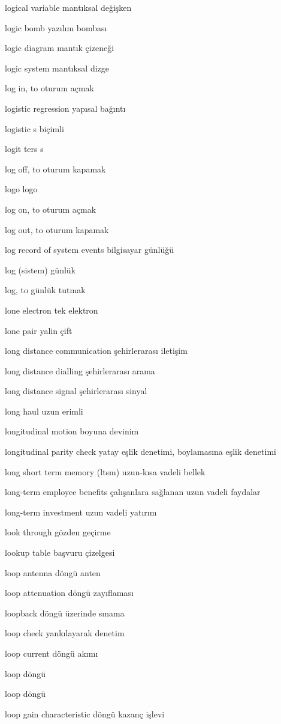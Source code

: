 \documentclass[12pt,fleqn]{article}\usepackage{../../common}
\begin{document}
logical variable mantıksal değişken

logic bomb yazılım bombası

logic diagram mantık çizeneği

logic system mantıksal dizge

log in, to oturum açmak

logistic regression yapısal bağıntı

logistic s biçimli

logit ters s

log off, to oturum kapamak

logo logo

log on, to oturum açmak

log out, to oturum kapamak

log record of system events bilgisayar günlüğü

log (sistem) günlük

log, to günlük tutmak

lone electron tek elektron

lone pair yalin çift

long distance communication şehirlerarası iletişim

long distance dialling şehirlerarası arama

long distance signal şehirlerarası sinyal

long haul uzun erimli

longitudinal motion boyuna devinim

longitudinal parity check yatay eşlik denetimi, boylamasına eşlik denetimi

long short term memory (ltsm) uzun-kısa vadeli bellek

long-term employee benefits çalışanlara sağlanan uzun vadeli faydalar

long-term investment uzun vadeli yatırım

look through gözden geçirme

lookup table başvuru çizelgesi

loop antenna döngü anten

loop attenuation döngü zayıflaması

loopback döngü üzerinde sınama

loop check yankılayarak denetim

loop current döngü akımı

loop döngü

loop döngü

loop gain characteristic döngü kazanç işlevi
\end{document}
